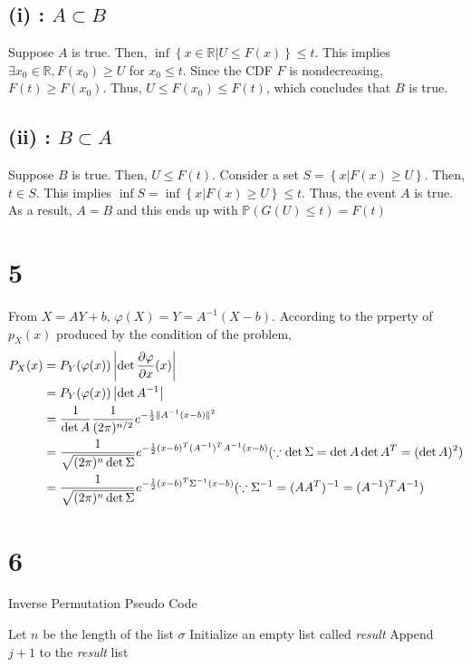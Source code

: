 \documentclass[10pt]{article}
\begin{document}
\subsection*{(i) : $A\subset B$}
Suppose $A$ is true. Then, $\inf\left\{x\in \mathbb{R}|U\le F(x)\right\} \le t$. This implies $\exists x_0 \in \mathbb{R}, F(x_0)\ge U$ for $x_0 \le t$.
Since the CDF $F$ is nondecreasing, $F(t) \ge F(x_0)$. Thus, $U \le F(x_0) \le F(t)$, which concludes that $B$ is true. 
\subsection*{(ii) : $B\subset A$}
Suppose $B$ is true. Then, $U\le F(t)$. Consider a set $S = \left\{x | F(x) \ge U\right\}$. Then, $t\in S$. This implies $\inf S = \inf \left\{x | F(x)\ge U\right\} \le t$. Thus, the event $A$ is true. 
As a result, $A = B$ and this ends up with $\mathbb{P}(G(U) \le t) = F(t)$
\section*{5}
From $X = AY + b$, $\varphi(X) = Y = A^{-1}\left(X - b\right)$. According to the prperty of $p_X(x)$ produced by the condition of the problem,
\begin{align*}
    P_X(x) &= P_Y(\varphi(x))\left|\det {\partial \varphi\over \partial x}(x)\right| \\
    &= P_Y(\varphi(x))\left|\det A^{-1}\right|\\
    &= \frac{1}{\det A}\frac{1}{(2\pi)^{n/2}}e^{-\frac{1}{2}\lVert A^{-1}(x-b)\rVert^2} \\
    &= \frac{1}{\sqrt{(2\pi)^n \det \Sigma}} e^{-\frac{1}{2}(x-b)^T(A^{-1})^TA^{-1}(x-b)} (\because \det\Sigma  = \det A \det A^T = (\det A)^2) \\
    &= \frac{1}{\sqrt{(2\pi)^n \det \Sigma}} e^{-\frac{1}{2}(x-b)^T \Sigma^{-1}(x-b)} (\because \Sigma^{-1} = (AA^T)^{-1} = (A^{-1})^TA^{-1})
\end{align*}
\section*{6}
\begin{algorithm}
    \caption{Inverse Permutation Pseudo Code}
    \begin{algorithmic}[1]
    \State Let $n$ be the length of the list $\sigma$
    \State Initialize an empty list called \textit{result}
                \State Append $j+1$ to the \textit{result} list
            \EndIf
        \EndFor
    \EndFor
    \end{algorithmic}
\end{algorithm}
\end{document}
